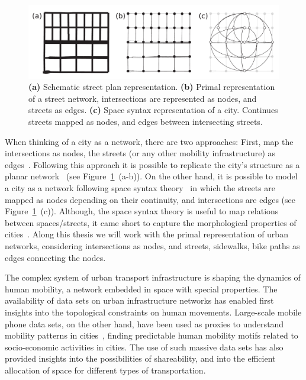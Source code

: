\begin{figure}[th!]
	\centering
	\includegraphics[width=\textwidth]{images/introduction/networks.pdf}
	\caption[Network representation of a city]{\textbf{(a)} Schematic street plan representation. \textbf{(b)} Primal representation of a street network, intersections are represented as nodes, and streets as edges. \textbf{(c)} Space syntax representation of a city. Continues streets mapped as nodes, and edges between intersecting streets.}
	\label{fig:networks}
\end{figure}

When thinking of a city as a network, there are two approaches: First, map the intersections as nodes, the streets (or any other mobility infrastructure) as edges~\cite{porta2006primal}. Following this approach it is possible to replicate the city's structure as a planar network~\cite{Boeing2020Planarity} (see Figure~\ref{fig:networks}~(a-b)). On the other hand, it is possible to model a city as a network following space syntax theory~\cite{hillier1976syntax} in which the streets are mapped as nodes depending on their continuity, and intersections are edges (see Figure~\ref{fig:networks}~(c)). Although, the space syntax theory is useful to map relations between spaces/streets, it came short to capture the morphological properties of cities~\cite{batty2004new}. Along this thesis we will work with the primal representation of urban networks, considering intersections as nodes, and streets, sidewalks, bike paths as edges connecting the nodes.


The complex system of urban transport infrastructure is shaping the dynamics of human mobility, a network embedded in space with special properties. The availability of data sets on urban infrastructure networks has enabled first insights into the topological constraints on human movements. Large-scale mobile phone data sets, on the other hand, have been used as proxies to understand mobility patterns in cities~\cite{gonzalez2008understanding}, finding predictable human mobility motifs related to socio-economic activities in cities. The use of such massive data sets has also provided insights into the possibilities of shareability, and into the efficient allocation of space for different types of transportation.

